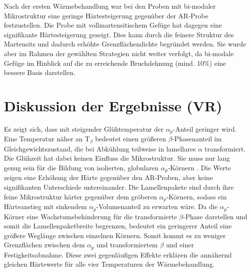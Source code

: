 Nach der ersten Wärmebehandlung war bei den Proben mit bi-modaler Mikrostruktur eine geringe Härtesteigerung gegenüber der AR-Probe festzustellen. 
Die Probe mit vollmartensitischem Gefüge hat dagegen eine signifikante Härtesteigerung gezeigt. Dies kann durch die feinere Struktur des Martensits und dadurch erhöhte Grenzflächendichte begründet werden. Sie wurde aber im Rahmen der gewählten Strategien nicht weiter verfolgt, da bi-modale Gefüge im Hinblick auf die zu erreichende Bruchdehnung (mind. 10\%) eine bessere Basis darstellen.


\section{Diskussion der Ergebnisse (VR)}

Es zeigt sich, dass mit steigender Glühtemperatur der $\alpha_p$-Anteil geringer wird. Eine Temperatur näher an T$_{\beta}$ bedeutet einen größeren $\beta$-Phasenanteil im Gleichgewichtszustand, die bei Abkühlung teilweise in lamellares $\alpha$ transformiert. Die Glühzeit hat dabei keinen Einfluss die Mikrostruktur. Sie muss nur lang genug sein für die Bildung von isolierten, globularen $\alpha_p$-Körnern \cite{G.LutjeringJ.C.WilliamsA.Gysler.}. 
Die Werte zeigen eine Erhöhung der Härte gegenüber den AR-Proben, aber keine signifikanten Unterschiede untereinander. Die Lamellenpakete sind durch ihre feine Mikrostruktur härter gegenüber dem gröberen $\alpha_p$-Körnern, sodass ein Härteanstieg mit sinkendem $\alpha_p$-Volumenanteil zu erwarten wäre. Da die $\alpha_p$-Körner eine Wachstumsbehinderung für die transformierte $\beta$-Phase darstellen und somit die Lamellenpaketbreite begrenzen, bedeutet ein geringerer Anteil eine größere Weglänge zwischen einzelnen Körnern. Somit kommt es zu weniger Grenzflächen zwischen dem $\alpha_p$ und transformiertem $\beta$ und einer Festigkeitsabnahme. Diese zwei gegenläufigen Effekte erklären die annähernd gleichen Härtewerte für alle vier Temperaturen der Wärmebehandlung. 